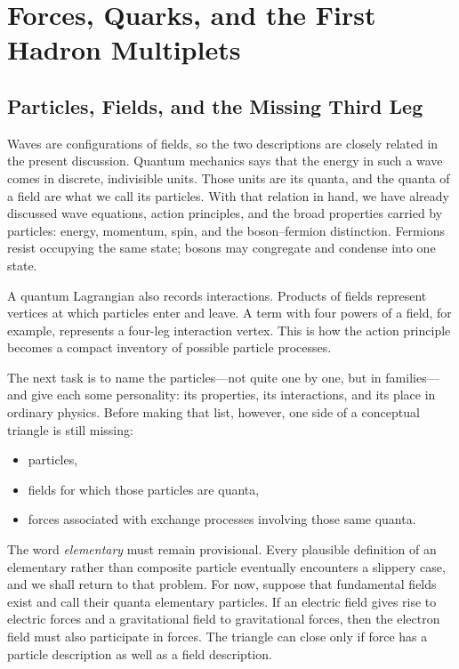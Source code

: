 \chapter{Forces, Quarks, and the First Hadron Multiplets}

\section{Particles, Fields, and the Missing Third Leg}

Waves are configurations of fields, so the two descriptions are closely related in the present discussion. Quantum mechanics says that the energy in such a wave comes in discrete, indivisible units. Those units are its quanta, and the quanta of a field are what we call its particles. With that relation in hand, we have already discussed wave equations, action principles, and the broad properties carried by particles: energy, momentum, spin, and the boson--fermion distinction. Fermions resist occupying the same state; bosons may congregate and condense into one state.

A quantum Lagrangian also records interactions. Products of fields represent vertices at which particles enter and leave. A term with four powers of a field, for example, represents a four-leg interaction vertex. This is how the action principle becomes a compact inventory of possible particle processes.

The next task is to name the particles---not quite one by one, but in families---and give each some personality: its properties, its interactions, and its place in ordinary physics. Before making that list, however, one side of a conceptual triangle is still missing:
\begin{itemize}
\item particles,
\item fields for which those particles are quanta,
\item forces associated with exchange processes involving those same quanta.
\end{itemize}

The word \emph{elementary} must remain provisional. Every plausible definition of an elementary rather than composite particle eventually encounters a slippery case, and we shall return to that problem. For now, suppose that fundamental fields exist and call their quanta elementary particles. If an electric field gives rise to electric forces and a gravitational field to gravitational forces, then the electron field must also participate in forces. The triangle can close only if force has a particle description as well as a field description.

